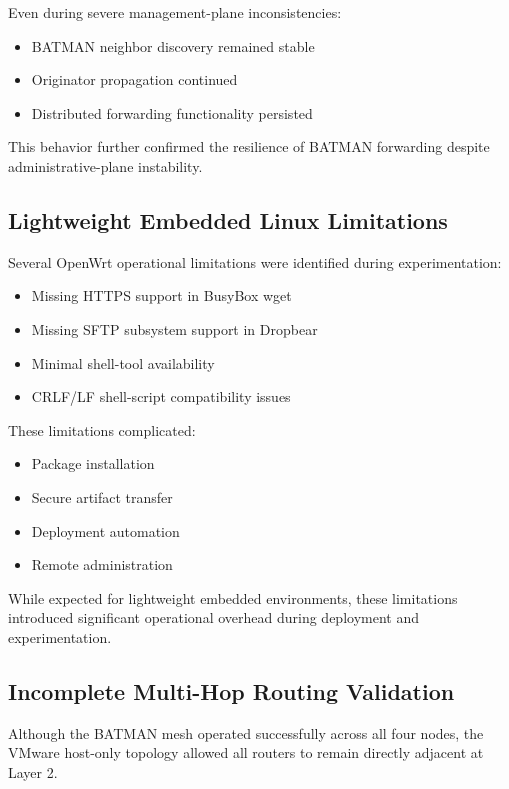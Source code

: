 \documentclass[conference]{IEEEtran}
\begin{document}
Even during severe management-plane inconsistencies:

\begin{itemize}
    \item BATMAN neighbor discovery remained stable
    \item Originator propagation continued
    \item Distributed forwarding functionality persisted
\end{itemize}

This behavior further confirmed the resilience of BATMAN forwarding despite administrative-plane instability.

\subsection{Lightweight Embedded Linux Limitations}

Several OpenWrt operational limitations were identified during experimentation:

\begin{itemize}
    \item Missing HTTPS support in BusyBox wget
    \item Missing SFTP subsystem support in Dropbear
    \item Minimal shell-tool availability
    \item CRLF/LF shell-script compatibility issues
\end{itemize}

These limitations complicated:
\begin{itemize}
    \item Package installation
    \item Secure artifact transfer
    \item Deployment automation
    \item Remote administration
\end{itemize}

While expected for lightweight embedded environments, these limitations introduced significant operational overhead during deployment and experimentation.

\subsection{Incomplete Multi-Hop Routing Validation}

Although the BATMAN mesh operated successfully across all four nodes, the VMware host-only topology allowed all routers to remain directly adjacent at Layer 2.
\end{document}
